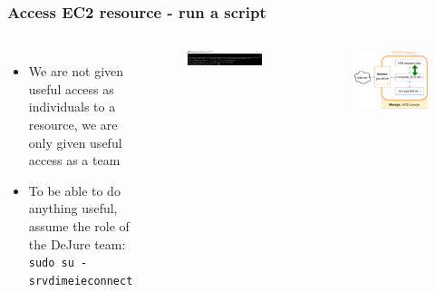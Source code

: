 \documentclass[aspectratio=169]{beamer} %
\newcommand{\teamName}{DeJure }
\newcommand{\srvAcctName}{srvdimeieconnect}
\begin{document}
\begin{frame}
	\frametitle{Access EC2 resource - run a script}
	\begin{columns}[c]
		\begin{itemize}
			\item We are not given useful access as individuals to a resource,
			 we are only given useful access as a team
			\item To be able to do anything useful,
			assume the role of the \teamName team: \newline
			\texttt{sudo su - \srvAcctName}
		\end{itemize}

		\begin{figure}
			\centering
			\includegraphics[width=\textwidth]{./img/access-4.png}
		\end{figure}

		\begin{figure}
			\centering
			\includegraphics[width=\textwidth]{./img/wb-aws-iam.png}
		\end{figure}

	\end{columns}
\end{frame}
\end{document}
